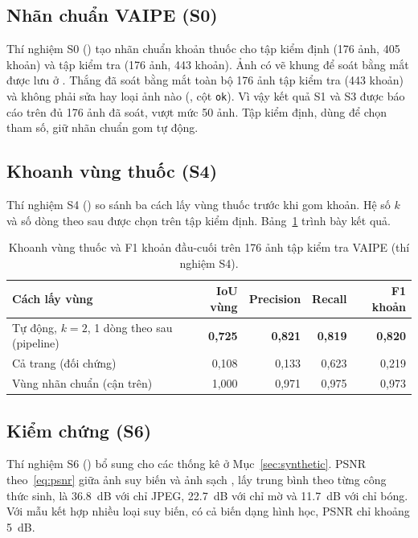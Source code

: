 \subsection{Nhãn chuẩn VAIPE (S0)}
Thí nghiệm S0 () tạo nhãn chuẩn khoản thuốc cho tập kiểm định (176 ảnh, 405 khoản) và tập kiểm tra (176 ảnh, 443 khoản).
Ảnh có vẽ khung để soát bằng mắt được lưu ở .
Thắng đã soát bằng mắt toàn bộ 176 ảnh tập kiểm tra (443 khoản) và không phải sửa hay loại ảnh nào (, cột \texttt{ok}).
Vì vậy kết quả S1 và S3 được báo cáo trên đủ 176 ảnh đã soát, vượt mức 50 ảnh.
Tập kiểm định, dùng để chọn tham số, giữ nhãn chuẩn gom tự động.

\subsection{Khoanh vùng thuốc (S4)}
Thí nghiệm S4 () so sánh ba cách lấy vùng thuốc trước khi gom khoản.
Hệ số $k$ và số dòng theo sau được chọn trên tập kiểm định.
Bảng~\ref{tab:S4} trình bày kết quả.

\begin{table}[H]
\centering\small
\caption{Khoanh vùng thuốc và F1 khoản đầu-cuối trên 176 ảnh tập kiểm tra VAIPE (thí nghiệm S4).}\label{tab:S4}
\begin{tabular}{lrrrr}
\toprule
\textbf{Cách lấy vùng} & \textbf{IoU vùng} & \textbf{Precision} & \textbf{Recall} & \textbf{F1 khoản} \\
\midrule
Tự động, $k=2$, 1 dòng theo sau (pipeline) & \textbf{0,725} & \textbf{0,821} & \textbf{0,819} & \textbf{0,820} \\
Cả trang (đối chứng) & 0,108 & 0,133 & 0,623 & 0,219 \\
\midrule
Vùng nhãn chuẩn (cận trên) & 1,000 & 0,971 & 0,975 & 0,973 \\
\bottomrule
\end{tabular}
\end{table}

\subsection{Kiểm chứng  (S6)}
Thí nghiệm S6 () bổ sung cho các thống kê ở Mục~\ref{sec:synthetic}.
PSNR theo~\eqref{eq:psnr} giữa ảnh suy biến và ảnh sạch , lấy trung bình theo từng công thức sinh, là \SI{36.8}{dB} với chỉ JPEG, \SI{22.7}{dB} với chỉ mờ và \SI{11.7}{dB} với chỉ bóng.
Với mẫu kết hợp nhiều loại suy biến, có cả biến dạng hình học, PSNR chỉ khoảng \SI{5}{dB}.

